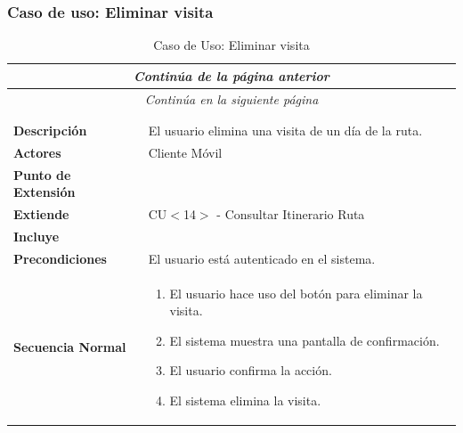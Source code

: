 \subsubsection*{Caso de uso: Eliminar visita }
\begin{longtable}{| p{4cm} | p{10cm} |}
\endfirsthead
\multicolumn{2}{c}{\textit{Continúa de la página anterior}}\\[12pt]
\hline
\endhead
\hline
\multicolumn{2}{c}{\textit{Continúa en la siguiente página}} \\
\endfoot
\hline
\caption{Caso de Uso: Eliminar visita}\label{fig:1}\\
\endlastfoot


\hline
\multicolumn{2}{|c|}{\textbf{CU$<$17$>$ - Eliminar Visita}} \\

\hline
\textbf{Descripción} &
El usuario elimina una visita de un día de la ruta.\\

\hline
\textbf{Actores} &
Cliente Móvil\\

\hline
\textbf{Punto de Extensión} &
\\

\hline
\textbf{Extiende} &
CU$<$14$>$ - Consultar Itinerario Ruta
\\

\hline
\textbf{Incluye} &
\\

\hline
\textbf{Precondiciones} &
El usuario está autenticado en el sistema.\\

\hline
\textbf{Secuencia Normal} &\mbox{}\par\vspace{-\baselineskip}
\begin{enumerate}[leftmargin=0.7cm, topsep=0.1cm]
\item El usuario hace uso del botón para eliminar la visita.
\item El sistema muestra una pantalla de confirmación.
\item El usuario confirma la acción.
\item El sistema elimina la visita.
\end{enumerate}



\end{longtable}
